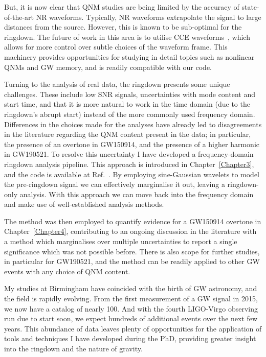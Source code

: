 \documentclass[
12pt, %
english, %
doublespacing, %
headsepline, %
]{MastersDoctoralThesis} %
\begin{document}
But, it is now clear that QNM studies are being limited by the accuracy of state-of-the-art NR waveforms. 
Typically, NR waveforms extrapolate the signal to large distances from the source.
However, this is known to be sub-optimal for the ringdown.
The future of work in this area is to utilise CCE waveforms~\cite{MaganaZertuche:2021syq}, which allows for more control over subtle choices of the waveform frame.
This machinery provides opportunities for studying in detail topics such as nonlinear QNMs and GW memory, and is readily compatible with our code.

Turning to the analysis of real data, the ringdown presents some unique challenges. 
These include low SNR signals, uncertainties with mode content and start time, and that it is more natural to work in the time domain (due to the ringdown's abrupt start) instead of the more commonly used frequency domain.
Differences in the choices made for the analyses have already led to disagreements in the literature regarding the QNM content present in the data; in particular, the presence of an overtone in GW150914, and the presence of a higher harmonic in GW190521. 
To resolve this uncertainty I have developed a frequency-domain ringdown analysis pipeline.
This approach is introduced in Chapter~\ref{Chapter3}, and the code is available at Ref.~\cite{fdringdown}.
By employing sine-Gaussian wavelets to model the pre-ringdown signal we can effectively marginalise it out, leaving a ringdown-only analysis. 
With this approach we can move back into the frequency domain and make use of well-established analysis methods.

The method was then employed to quantify evidence for a GW150914 overtone in Chapter~\ref{Chapter4}, contributing to an ongoing discussion in the literature with a method which marginalises over multiple uncertainties to report a single significance which was not possible before.
There is also scope for further studies, in particular for GW190521, and the method can be readily applied to other GW events with any choice of QNM content. 

My studies at Birmingham have coincided with the birth of GW astronomy, and the field is rapidly evolving.
From the first measurement of a GW signal in 2015, we now have a catalog of nearly 100.
And with the fourth LIGO-Virgo observing run due to start soon, we expect hundreds of additional events over the next few years.
This abundance of data leaves plenty of opportunities for the application of tools and techniques I have developed during the PhD, providing greater insight into the ringdown and the nature of gravity.
\end{document}
